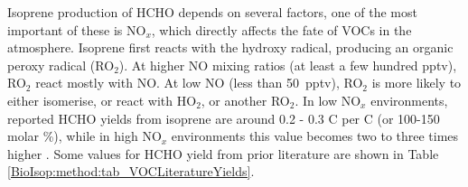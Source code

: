       Isoprene production of HCHO depends on several factors, one of the most important of these is NO$_x$, which directly affects the fate of VOCs in the atmosphere.
      Isoprene first reacts with the hydroxy radical, producing an organic peroxy radical (RO$_2$).
      At higher NO mixing ratios (at least a few hundred pptv), RO$_2$ react mostly with NO. 
      At low NO (less than 50~pptv), RO$_2$ is more likely to either isomerise, or react with HO$_2$, or another RO$_2$.
      In low NO$_x$ environments, reported HCHO yields from isoprene are around 0.2 - 0.3 C per C (or 100-150 molar \%), while in high NO$_x$ environments this value becomes two to three times higher \parencite{Palmer2003, Wolfe2016}.
      Some values for HCHO yield from prior literature are shown in Table \ref{BioIsop:method:tab_VOCLiteratureYields}.
      
      
